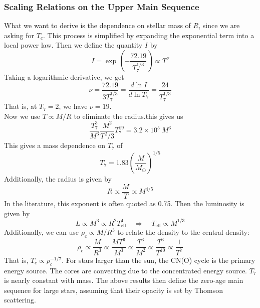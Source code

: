 \documentclass[10pt]{article}
\numberwithin{equation}{section}
\newcommand{\n}{\noindent}
\begin{document}
    \subsubsection{Scaling Relations on the Upper Main Sequence}
    \label{sec:scal-relat-upper}

    What we want to derive is
    the dependence on stellar mass of $R$, since we are asking for
    $T_c$. This process is simplified by expanding the exponential
    term into a local power law. Then we define the quantity $I$ by
    \begin{equation}
      \label{eq:180}
      I=\exp\left(-\frac{72.19}{T_7^{1/3}}\right)\propto T^\nu
    \end{equation}
    Taking a logarithmic derivative, we get
    \begin{equation}
      \label{eq:181}
      \nu=\frac{72.19}{3T_7^{1/3}}=\frac{d\ln I}{d\ln T_7}=\frac{24}{T_7^
{1/3}}
    \end{equation}
    That is, at $T_7=2$, we have $\nu=19$.\\

    \n Now we use $T\propto M/R$ to eliminate the radius.this gives us
    \begin{equation}
      \label{eq:182}
      \frac{T_7^3}{M^3}\frac{M^2}{T^2/3}T_7^{19}=3.2\times 10^5\ M^3
    \end{equation}
    This gives a mass dependence on $T_7$ of
    \begin{equation}
      \label{eq:183}
      \boxed{T_7=1.83 \left(\frac{M}{M_\odot}\right)^{1/5}}
    \end{equation}
		Additionally, the radius is given by
    \begin{equation}
      \label{eq:184}
      R\propto \frac{M}{T}\propto M^{4/5}
    \end{equation}
    In the literature, this exponent is often quoted as
    0.75. Then the luminosity is given by
    \begin{equation}
      \label{eq:185}
      L\propto M^3\propto R^2T_{\mathrm{eff}}^4\quad\Rightarrow\quad
      T_{\mathrm{eff}}\propto M^{1/3}
    \end{equation}
    Additionally, we can use $\rho_c\propto M/R^3$ to relate the
    density to the central density:
    \begin{equation}
      \label{eq:186}
      \rho_c\propto \frac{M}{R^3}\propto \frac{M T^3}{M^3}\propto
      \frac{T^3}{M^2}\propto \frac{T^3}{T^{10}}\propto \frac{1}{T^7}
    \end{equation}
    That is, $T_c\propto \rho_c^{-1/7}$. For stars larger than the
    sun, the CN(O) cycle is the primary energy source. The cores are
    convecting due to the concentrated energy source. $T_7$ is nearly
    constant with mass. The above results then define the zero-age
    main sequence for large stars, assuming that their opacity is set
    by Thomson scattering.\\
		
\end{document}
